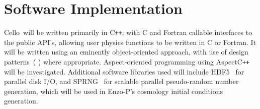 \documentclass[11pt,letterpaper]{article}
\newcommand{\cello}{\textsf{Cello}}
\newcommand{\enzoii}{\textsf{Enzo-P}}
\newcommand{\pp}{\texttt{++}}
\newcommand{\cpp}{C\pp}
\newcommand{\code}[1]{\textsf{#1}}
\begin{document}
% 
% 

\section{Software Implementation} \label{s:implementation}

\cello\ will be written primarily in \cpp, with C and Fortran callable
interfaces to the public API's, allowing user physics functions to be
written in C or Fortran.  It will be written using an eminently
object-oriented approach, with use of design patterns~(\cite{GaHe95}
\cite{BuHe07}) where appropriate.  Aspect-oriented programming
using \code{Aspect\cpp}~\cite{wwwaspectcpp} will be investigated.
Additional software libraries used will include HDF5~\cite{hdf5} for
parallel disk I/O, and SPRNG~\cite{wwwsprng} for scalable parallel
pseudo-random number generation, which will be used in \enzoii's
cosmology initial conditions generation.
\end{document}
